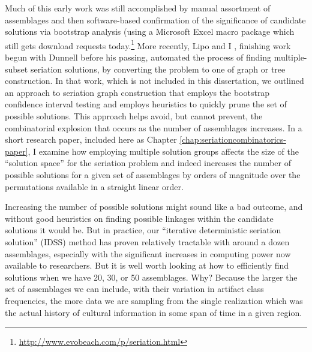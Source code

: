 Much of this early work was still accomplished by manual assortment of assemblages and then software-based confirmation of the significance of candidate solutions via bootstrap analysis (using a Microsoft Excel macro package which still gets download requests today.\footnote{\url{http://www.evobeach.com/p/seriation.html}}  More recently, Lipo and I \citeyearpar{Lipo2015}, finishing work begun with Dunnell before his passing, automated the process of finding multiple-subset seriation solutions, by converting the problem to one of graph or tree construction. In that work, which is not included in this dissertation, we outlined an approach to seriation graph construction that employs the bootstrap confidence interval testing and employs heuristics to quickly prune the set of possible solutions. This approach helps avoid, but cannot prevent, the combinatorial explosion that occurs as the number of assemblages increases. In a short research paper, included here as Chapter \ref{chap:seriationcombinatorics-paper}, I examine how employing multiple solution groups affects the size of the “solution space” for the seriation problem and indeed increases the number of possible solutions for a given set of assemblages by orders of magnitude over the permutations available in a straight linear order.

Increasing the number of possible solutions might sound like a bad outcome, and without good heuristics on finding possible linkages within the candidate solutions it would be. But in practice, our “iterative deterministic seriation solution” (IDSS) method has proven relatively tractable with around a dozen assemblages, especially with the significant increases in computing power now available to researchers. But it is well worth looking at how to efficiently find solutions when we have 20, 30, or 50 assemblages. Why? Because the larger the set of assemblages we can include, with their variation in artifact class frequencies, the more data we are sampling from the single realization which was the actual history of cultural information in some span of time in a given region.

